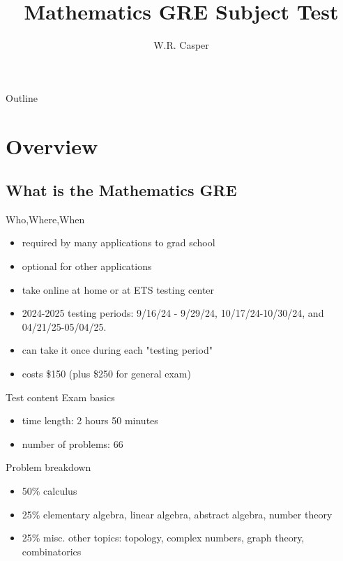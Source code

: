\documentclass{beamer}
\title{Mathematics GRE Subject Test}
\subtitle
{} %
\author[W.R. Casper] %
{W.R. Casper}
\institute[California State University Fullerton] %
{
  Department of Mathematics\\
  California State University Fullerton}
\begin{document}
\begin{frame}
  \titlepage
\end{frame}

\begin{frame}{Outline}
  \tableofcontents
\end{frame}



\section{Overview}

\subsection{What is the Mathematics GRE}

\begin{frame}{Who,Where,When}
\begin{itemize}
\item required by many applications to grad school
\item optional for other applications
\item take online at home or at ETS testing center 
\item 2024-2025 testing periods: 9/16/24 - 9/29/24,  10/17/24-10/30/24, and  04/21/25-05/04/25.
\item can take it once during each "testing period"
\item costs \$150 (plus \$250 for general exam)
\end{itemize}
\end{frame}

\begin{frame}{Test content}
Exam basics
\begin{itemize}
\item time length: 2 hours 50 minutes
\item number of problems: 66
\end{itemize}
Problem breakdown
\begin{itemize}
\item 50\% calculus
\item 25\% elementary algebra, linear algebra, abstract algebra, number theory
\item 25\% misc. other topics: topology, complex numbers, graph theory, combinatorics
\end{itemize}
\end{frame}
\end{document}
